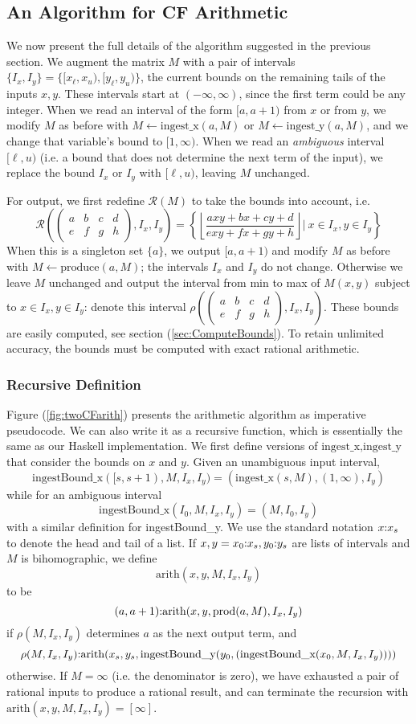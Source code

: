 \documentclass[11pt, oneside]{amsart}   	%
\newcommand{\bihom}[8]{{\frac{#1 xy + #2 x + #3 y + #4}{#5 xy + #6 x + #7 y + #8}}}
\newcommand{\abcd}{\left(
\begin{smallmatrix} 
a & b & c & d\\ 
e & f & g & h
\end{smallmatrix}
\right)}
\renewcommand{\:}{\negthickspace:\negthickspace}
\begin{document}
\subsection{An Algorithm for CF Arithmetic}\label{sec:finalAlgorithm}
We now present the full details of the algorithm suggested in the previous section.  We augment the matrix $M$ with a pair of intervals
$\{I_x, I_y\} = \{[x_{\ell},x_{u}), [y_{\ell}, y_{u})\}$, the current bounds on the remaining tails of the inputs $x,y$. These
intervals start at $(-\infty, \infty)$, since the first term could be any integer. When we read an interval of the form $[a,a+1)$ from
$x$ or from $y$, we modify $M$ as before with $M \leftarrow \mbox{ingest\_x}(a,M)$ or $M \leftarrow \mbox{ingest\_y}(a,M)$,
and we change that variable's bound to $[1, \infty)$. When we read an \emph{ambiguous} interval $[\ell, u)$ (i.e. a bound that
does not determine the next term of the input), we replace the bound $I_x$ or $I_y$  with $[\ell, u)$, leaving $M$ unchanged.

For output, we first redefine $\mathcal{R}(M)$ to take the bounds into account, i.e.
\[
\mathcal{R}\left(\abcd, I_x, I_y\right) = \left\{ \left\lfloor \bihom{a}{b}{c}{d}{e}{f}{g}{h} \right\rfloor | \  x \in I_x, y \in I_y \right\}
\]
When this is a singleton set $\{a\}$, we output $[a,a+1)$ and modify $M$ as before with $M \leftarrow \mbox{produce}(a,M)$;
the intervals $I_x$ and $I_y$ do not change. Otherwise we leave $M$ unchanged and output the interval from min to max of $M(x,y)$ subject to $x \in I_x, y \in I_y$:
denote this interval $\rho\left(\abcd, I_x, I_y\right)$.
These bounds are easily computed, see section (\ref{sec:ComputeBounds}).
To retain unlimited accuracy, the bounds must be computed with exact rational arithmetic.

\subsubsection{Recursive Definition}
Figure (\ref{fig:twoCFarith}) presents the arithmetic algorithm as imperative pseudocode. We can also write it as a recursive function,
which is essentially the same as our Haskell implementation.
We first define versions of $\mbox{ingest\_x},\mbox{ingest\_y}$ that consider the bounds on $x$ and $y$. Given an unambiguous input interval,
\[
\mbox{ingestBound\_x}([s,s+1), M, I_x, I_y) = 
(\mbox{ingest\_x}(s,M), (1,\infty),I_y)
\]
while for an ambiguous interval
\[
\mbox{ingestBound\_x}(I_0, M, I_x, I_y) = 
(M, I_0,I_y)
\]
with a similar definition for \mbox{ingestBound\_y}.
We use the standard notation $x\:x_s$ to denote the head and tail of a list. 
If $x,y = x_0\:x_s, y_0\:y_s$ are lists of intervals and $M$ is bihomographic, we define
\[
\mbox{arith}(x,y, M, I_x, I_y)
\]
to be
\[
(a,a+1)\:\mbox{arith}(x,y,  \mbox{prod}(a,M) ,  I_x,  I_y)
\]
if $\rho(M,I_x,I_y)$ determines $a$ as the next output term, and
\[
\rho(M,I_x,I_y)\:\mbox{arith}(x_s,y_s,  \mbox{ingestBound\_y}( y_0, (\mbox{ingestBound\_x}(x_0,M,I_x,I_y)) ))
\]
otherwise. If $M=\infty$ (i.e. the denominator is zero), we have exhausted a pair of rational inputs to produce a rational result, and can terminate the recursion with $\mbox{arith}(x,y, M, I_x, I_y) = [\infty]$.
\end{document}
